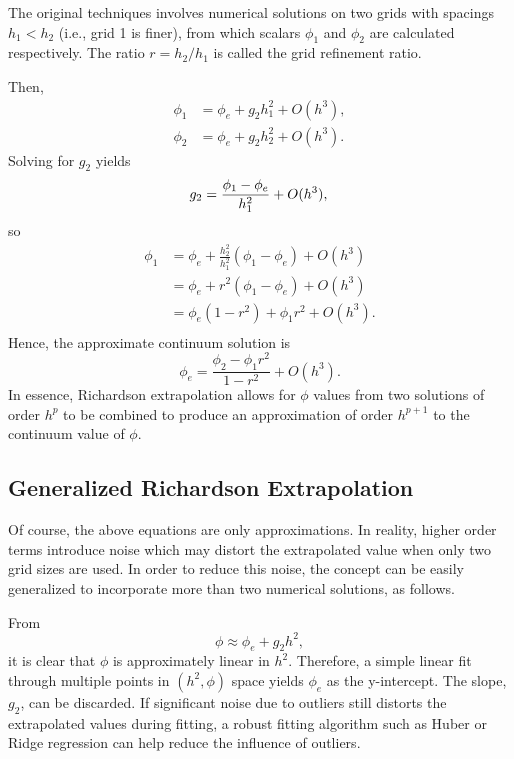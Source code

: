 The original techniques involves numerical solutions on two grids with spacings $h_1 < h_2$ (i.e., grid 1 is finer), from which scalars $\phi_1$ and $\phi_2$ are calculated respectively.
The ratio $r = h_2/h_1$ is called the grid refinement ratio.

Then,
\begin{align*}
  \phi_1 &= \phi_e + g_2 h_1^2 + O(h^3), \\
  \phi_2 &= \phi_e + g_2 h_2^2 + O(h^3).
\end{align*}
Solving for $g_2$ yields
\begin{equation*}
  g_2 = \frac{\phi_1 - \phi_e}{h_1^2} + O(h^3), \\
\end{equation*}
so
\begin{align*}
  \phi_1 &= \phi_e + \frac{h_2^2}{h_1^2}(\phi_1 - \phi_e) + O(h^3) \\
  &=  \phi_e + r^2(\phi_1 - \phi_e) + O(h^3) \\
  &= \phi_e(1-r^2) + \phi_1 r^2 + O(h^3). \\
\end{align*}
Hence, the approximate continuum solution is
\begin{equation*}
  \phi_e = \frac{\phi_2 - \phi_1 r^2}{1 - r^2} + O(h^3).
\end{equation*}
In essence, Richardson extrapolation allows for $\phi$ values from two solutions of order $h^p$ to be combined to produce an approximation of order $h^{p+1}$ to the continuum value of $\phi$.

\subsection{Generalized Richardson Extrapolation}
Of course, the above equations are only approximations.
In reality, higher order terms introduce noise which may distort the extrapolated value
when only two grid sizes are used.
In order to reduce this noise, the concept can be easily generalized to incorporate more than two numerical solutions, as follows.

From
\begin{equation*}
  \phi \approx \phi_e + g_2 h^2,
\end{equation*}
it is clear that $\phi$ is approximately linear in $h^2$.
Therefore, a simple linear fit through multiple points in $(h^2, \phi)$ space yields $\phi_e$ as the y-intercept.
The slope, $g_2$, can be discarded.
If significant noise due to outliers still distorts the extrapolated values during fitting, a robust fitting algorithm such as Huber \cite{yu_robust_2014} or Ridge \cite{hoerl_ridge_1970} regression can help reduce the influence of outliers.

